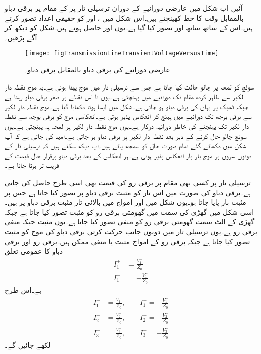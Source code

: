 آئیں اب شکل  میں عارضی دورانیے  کے دوران ترسیلی تار پر  کے مقام پر  برقی دباو بالمقابل وقت کا خط کھینچتے ہیں۔اس شکل میں ،  اور  کو حقیقی اعداد تصور کرتے ہیں۔اس کے ساتھ ساتھ  اور  تصور کیا گیا ہے۔یوں  اور  حاصل ہوتے ہیں۔شکل  کو دیکھ کر آگے پڑھیں۔
\begin{figure}
\centering
\texttt{[image: figTransmissionLineTransientVoltageVersusTime]}
\caption{عارضی دورانیے کی برقی دباو بالمقابل برقی دباو۔}
\label{شکل_ترسیلی_عارضی_برقی_دباو_بالمقابل_وقت}
\end{figure}

 سوئچ کو لمحہ  پر چالو حالت کیا جاتا ہے جس سے ترسیلی تار میں  موج پیدا ہوتی ہے۔یہ موج نقطہ دار لکیر سے ظاہر کردہ مقام تک  دورانیے میں پہنچتی ہے۔یوں  تا  اس نقطے پر صفر برقی دباو رہتا ہے جبکہ ٹھیک  پر یہاں کی برقی دباو  ہو جاتی ہے۔شکل  میں ایسا ہوتا دکھایا گیا ہے۔موج  نقطہ دار لکیر سے برقی بوجھ تک  دورانیے میں پہنچ کر انعکاس پذیر ہوتی ہے۔انعکاسی موج کو برقی بوجھ سے نقطہ دار لکیر تک پہنچنے کی خاطر  دورانیہ درکار ہے۔یوں  موج نقطہ دار لکیر پر لمحہ  پہ پہنچتی ہے۔یوں سوئچ چالو حال کرنے کے  دیر بعد نقطہ دار لکیر پر برقی دباو  ہو جاتی ہے۔امید کی جاتی ہے کہ آپ شکل  میں دکھائے گئے تمام صورت حال کو سمجھ پائے ہیں۔آپ دیکھ سکتے ہیں کہ ترسیلی تار کے دونوں سروں پر موج بار بار انعکاس پذیر ہوتی ہے۔ہر انعکاس کے بعد برقی دباو برقرار حال قیمت کے قریب تر ہوتا جاتا ہے۔

ترسیلی تار پر کسی بھی مقام پر برقی رو کی قیمت بھی اسی طرح حاصل کی جاتی ہے۔برقی دباو کی صورت میں اس تار کو مثبت برقی دباو پر تصور کیا جاتا ہے جس پر مثبت بار پایا جاتا ہو۔یوں شکل  میں  اور  امواج میں بالائی تار مثبت برقی دباو پر ہیں۔اسی شکل میں گھڑی کی سمت میں گھومتی برقی رو کو مثبت تصور کیا جاتا ہے جبکہ گھڑی کے الٹ سمت گھومتی برقی رو کو منفی تصور کیا جاتا ہے۔یوں  مثبت جبکہ  منفی برقی رو ہے۔یوں ترسیلی تار میں دونوں جانب حرکت کرتی برقی دباو کی موج کو مثبت تصور کیا جاتا ہے جبکہ برقی رو کے امواج مثبت یا منفی ممکن ہیں۔برقی رو اور برقی دباو کا عمومی تعلق
\begin{align*}
I_1^+&=\frac{V_1^+}{Z_0}\\
I_1^-&=-\frac{V_1^-}{Z_0}
\end{align*}
ہے۔اس طرح 
\begin{align*}
I_1^+&=\frac{V_1^+}{Z_0} , \quad \quad I_1^-=-\frac{V_1^-}{Z_0}\\
I_2^+&=\frac{V_2^+}{Z_0} , \quad \quad I_2^-=-\frac{V_2^-}{Z_0}\\
I_3^+&=\frac{V_3^+}{Z_0} , \quad \quad  I_3^-=-\frac{V_3^-}{Z_0}
\end{align*} 
لکھے جائیں گے۔

